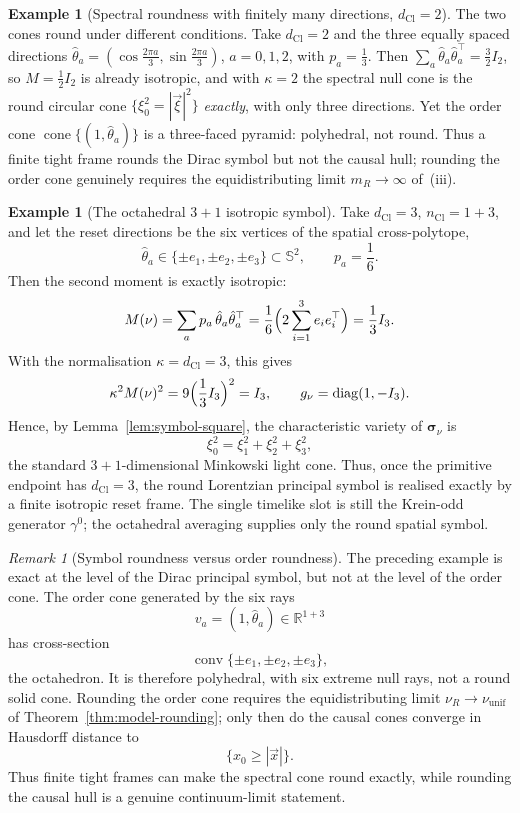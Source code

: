 \documentclass[11pt]{article}
\theoremstyle{definition}
\newtheorem{example}[theorem]{Example}
\theoremstyle{remark}
\newtheorem{remark}[theorem]{Remark}
\newcommand{\R}{\mathbb{R}}
\newcommand{\dCl}{d_{\mathrm{Cl}}}
\newcommand{\Sphere}{\mathbb{S}}
\newcommand{\cone}{\operatorname{cone}}
\newcommand{\sym}{\boldsymbol{\sigma}}
\begin{document}
\begin{example}[Spectral roundness with finitely many directions, $\dCl=2$]
\label{ex:tight-frame}
The two cones round under different conditions.  Take $\dCl=2$ and the three
equally spaced directions $\hat\theta_a=(\cos\tfrac{2\pi a}{3},
\sin\tfrac{2\pi a}{3})$, $a=0,1,2$, with $p_a=\tfrac13$.  Then
$\sum_a\hat\theta_a\hat\theta_a^{\top}=\tfrac32 I_2$, so
$M=\tfrac12 I_2$ is already isotropic, and with $\kappa=2$ the spectral null
cone is the round circular cone $\{\xi_0^2=|\vec\xi|^2\}$ \emph{exactly}, with
only three directions.  Yet the order cone $\cone\{(1,\hat\theta_a)\}$ is a
three-faced pyramid: polyhedral, not round.  Thus a finite tight frame rounds
the Dirac symbol but not the causal hull; rounding the order cone genuinely
requires the equidistributing limit $m_R\to\infty$ of
\,(iii).
\end{example}



\begin{example}[The octahedral \(3+1\) isotropic symbol]
\label{ex:3plus1}
Take \(\dCl=3\), \(n_{\mathrm{Cl}}=1+3\), and let the reset directions be the
six vertices of the spatial cross-polytope,
\[
  \hat\theta_a\in\{\pm e_1,\pm e_2,\pm e_3\}\subset\Sphere^{2},
  \qquad p_a=\frac16 .
\]
Then the second moment is exactly isotropic:
\[
  M(\nu)
  =\sum_a p_a\,\hat\theta_a\hat\theta_a^{\top}
  =\frac16\Bigl(2\sum_{i=1}^3 e_ie_i^{\top}\Bigr)
  =\frac13 I_3 .
\]
With the normalisation \(\kappa=\dCl=3\), this gives
\[
  \kappa^2M(\nu)^2
  =9\Bigl(\frac13 I_3\Bigr)^2
  =I_3,
  \qquad
  g_\nu=\operatorname{diag}(1,-I_3).
\]
Hence, by Lemma~\ref{lem:symbol-square}, the characteristic variety of
\(\sym_\nu\) is
\[
  \xi_0^2=\xi_1^2+\xi_2^2+\xi_3^2,
\]
the standard \(3+1\)-dimensional Minkowski light cone. Thus, once the primitive
endpoint has \(\dCl=3\), the round Lorentzian principal symbol is realised
exactly by a finite isotropic reset frame. The single timelike slot is still the
Krein-odd generator \(\gamma^0\); the octahedral averaging supplies only the
round spatial symbol.
\end{example}

\begin{remark}[Symbol roundness versus order roundness]
\label{rem:order-vs-symbol}
The preceding example is exact at the level of the Dirac principal symbol, but
not at the level of the order cone. The order cone generated by the six rays
\[
  v_a=(1,\hat\theta_a)\in\R^{1+3}
\]
has cross-section
\[
  \operatorname{conv}\{\pm e_1,\pm e_2,\pm e_3\},
\]
the octahedron. It is therefore polyhedral, with six extreme null rays, not a
round solid cone. Rounding the order cone requires the equidistributing limit
\(\nu_R\to\nu_{\mathrm{unif}}\) of Theorem~\ref{thm:model-rounding}; only then do
the causal cones converge in Hausdorff distance to
\[
  \{x_0\ge |\vec x|\}.
\]
Thus finite tight frames can make the spectral cone round exactly, while
rounding the causal hull is a genuine continuum-limit statement.
\end{remark}
\end{document}
